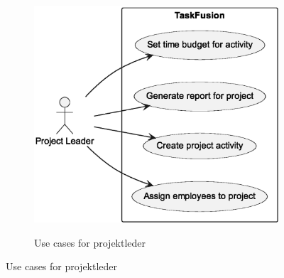 \begin{figure}[H]
\begin{subfigure}[c]{.4\textwidth}
        \vspace{10ex}

        \caption{Use cases for projektleder}
        \includegraphics[width=\textwidth]{RequirementsAndDesign/Diagrams/usecasesProjectLeader.eps}\label{fig:ucProjectLeader}
    \end{subfigure}
\end{figure}

